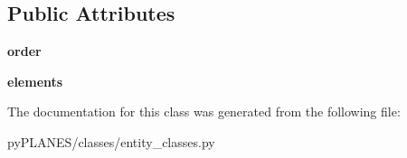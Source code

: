 \subsection*{Public Attributes}
\begin{DoxyCompactItemize}
\item 
\mbox{\label{classpy_p_l_a_n_e_s_1_1classes_1_1entity__classes_1_1_fem_entity_adcd9fcbc4261dd545bd17f60ddb63bf6}} 
{\bfseries order}
\item 
\mbox{\label{classpy_p_l_a_n_e_s_1_1classes_1_1entity__classes_1_1_fem_entity_a9ede6ff44775d1cb2a2f93c6d3c03103}} 
{\bfseries elements}
\end{DoxyCompactItemize}


The documentation for this class was generated from the following file\+:\begin{DoxyCompactItemize}
\item 
py\+P\+L\+A\+N\+E\+S/classes/entity\+\_\+classes.\+py\end{DoxyCompactItemize}
